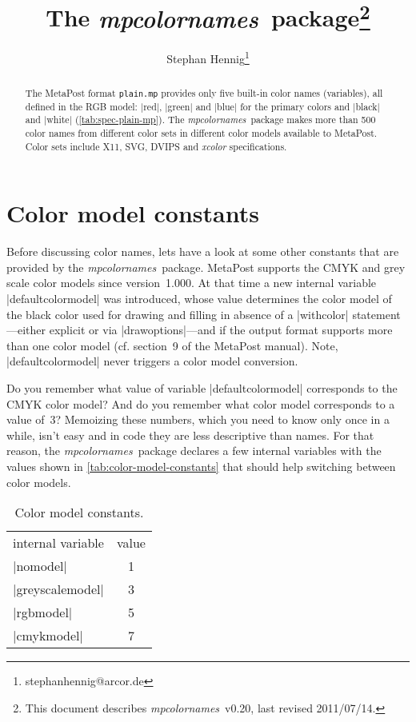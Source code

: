 \documentclass[DIV=9, captions=tableheading]{scrartcl}
\newcommand*{\cmd}[1]{\texttt{#1}}
\newcommand*{\name}[1]{\textsf{\mdseries\emph{#1}}}
\newcommand*{\pkg}{\name{mpcolornames}}
\begin{document}
\title{The \pkg\ package\thanks{This document describes \pkg\ v0.20,
    last revised 2011/07/14.}}
\author{Stephan Hennig\thanks{stephanhennig@arcor.de}}
\maketitle

\begin{abstract}
  The MetaPost format \cmd{plain.mp} provides only five built-in color
  names (variables), all defined in the RGB model: |red|, |green| and
  |blue| for the primary colors and |black| and |white|
  (\autoref{tab:spec-plain-mp}).  The \pkg\ package makes more than 500
  color names from different color sets in different color models
  available to MetaPost.  Color sets include X11, SVG, DVIPS and
  \name{xcolor} specifications.
\end{abstract}

\setcounter{secnumdepth}{3}
\setcounter{tocdepth}{3}
\begin{multicols}{2}
\tableofcontents
\end{multicols}


\section{Color model constants}
\label{sec:color-model-constants}
Before discussing color names, lets have a look at some other constants
that are provided by the \pkg\ package.  MetaPost supports the CMYK and
grey scale color models since version~1.000.  At that time a new
internal variable |defaultcolormodel| was introduced, whose value
determines the color model of the black color used for drawing and
filling in absence of a |withcolor| statement---either explicit or via
|drawoptions|---and if the output format supports more than one color
model (cf. section~9 of the MetaPost manual).  Note, |defaultcolormodel|
never triggers a color model conversion.

Do you remember what value of variable |defaultcolormodel| corresponds
to the CMYK color model?  And do you remember what color model
corresponds to a value of~3?  Memoizing these numbers, which you need to
know only once in a while, isn't easy and in code they are less
descriptive than names.  For that reason, the \pkg\ package declares a
few internal variables with the values shown in
\autoref{tab:color-model-constants} that should help switching between
color models.

\begin{table}
  \centering
  \caption{Color model constants.}
  \label{tab:color-model-constants}
  \begin{tabular}{lc}
    internal variable & value\\
    \addlinespace\toprule\addlinespace
    |nomodel| & 1\\
    |greyscalemodel| & 3\\
    |rgbmodel| & 5\\
    |cmykmodel| & 7\\
  \end{tabular}
\end{table}
\end{document}
